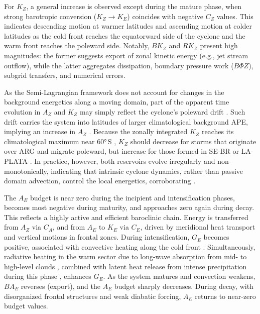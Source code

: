 \documentclass[pdflatex,sn-chicago]{sn-jnl}%
\theoremstyle{plain}
\theoremstyle{definition}
\theoremstyle{remark}
\theoremstyle{definition}
\begin{document}
For $K_Z$, a general increase is observed except during the mature phase, when strong barotropic conversion ($K_Z \rightarrow K_E$) coincides with negative $C_Z$ values. This indicates descending motion at warmer latitudes and ascending motion at colder latitudes as the cold front reaches the equatorward side of the cyclone and the warm front reaches the poleward side. Notably, $BK_Z$ and $RK_Z$ present high magnitudes: the former suggests export of zonal kinetic energy (e.g., jet stream outflow), while the latter aggregates dissipation, boundary pressure work ($B\Phi Z$), subgrid transfers, and numerical errors. 

As the Semi-Lagrangian framework does not account for changes in the background energetics along a moving domain, part of the apparent time evolution in \(A_Z\) and \(K_Z\) may simply reflect the cyclone’s poleward drift \citep{couto2024new}. Such drift carries the system into latitudes of larger climatological background APE, implying an increase in \(A_Z\) \citep{novak2018local, liu2024systematic}. Because the zonally integrated \(K_Z\) reaches its climatological maximum near 60°\,S \citep{novak2018local, liu2024systematic}, \(K_Z\) should decrease for storms that originate over ARG and migrate poleward, but increase for those formed in SE-BR or LA-PLATA . In practice, however, both reservoirs evolve irregularly and non-monotonically, indicating that intrinsic cyclone dynamics, rather than passive domain advection, control the local energetics, corroborating \citet{federer2025synoptic}.

The $A_E$ budget is near zero during the incipient and intensification phases, becomes most negative during maturity, and approaches zero again during decay. This reflects a highly active and efficient baroclinic chain. Energy is transferred from $A_Z$ via $C_A$, and from $A_E$ to $K_E$ via $C_E$, driven by meridional heat transport and vertical motions in frontal zones. During intensification, $G_E$ becomes positive, associated with convective heating along the cold front \citep[e.g.,][]{govekar2011three}. Simultaneously, radiative heating in the warm sector due to long-wave absorption from mid- to high-level clouds \citep{lau1997comparing,keshtgar2023cloud}, combined with latent heat release from intense precipitation during this phase \citep{mcerlich2023assessment}, enhances $G_E$. As the system matures and convection weakens, $BA_E$ reverses (export), and the $A_E$ budget sharply decreases. During decay, with disorganized frontal structures and weak diabatic forcing, $A_E$ returns to near-zero budget values.
\end{document}

